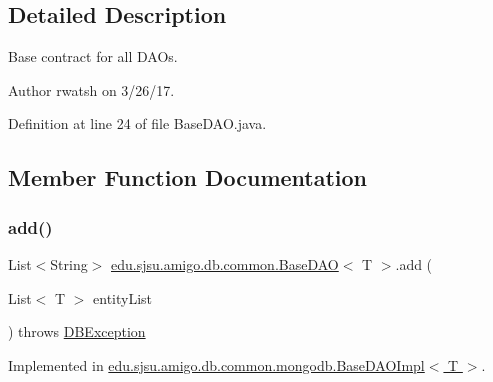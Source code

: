 \subsection{Detailed Description}
Base contract for all D\+A\+Os.

\begin{DoxyAuthor}{Author}
rwatsh on 3/26/17. 
\end{DoxyAuthor}


Definition at line 24 of file Base\+D\+A\+O.\+java.



\subsection{Member Function Documentation}
\mbox{\label{interfaceedu_1_1sjsu_1_1amigo_1_1db_1_1common_1_1_base_d_a_o_abee308a0e83d8e5a42f202dfc195d72c}} 
\subsubsection{\texorpdfstring{add()}{add()}}
{\footnotesize\ttfamily List$<$String$>$ \hyperlink{interfaceedu_1_1sjsu_1_1amigo_1_1db_1_1common_1_1_base_d_a_o}{edu.\+sjsu.\+amigo.\+db.\+common.\+Base\+D\+AO}$<$ T $>$.add (\begin{DoxyParamCaption}\item[{List$<$ T $>$}]{entity\+List }\end{DoxyParamCaption}) throws \hyperlink{classedu_1_1sjsu_1_1amigo_1_1db_1_1common_1_1_d_b_exception}{D\+B\+Exception}}



Implemented in \hyperlink{classedu_1_1sjsu_1_1amigo_1_1db_1_1common_1_1mongodb_1_1_base_d_a_o_impl_aa9f9296750acb9a6f356163e35157837}{edu.\+sjsu.\+amigo.\+db.\+common.\+mongodb.\+Base\+D\+A\+O\+Impl$<$ T $>$}.

\mbox{\label{interfaceedu_1_1sjsu_1_1amigo_1_1db_1_1common_1_1_base_d_a_o_a73dbf1e946ba180be688bc14d69cff88}} 
